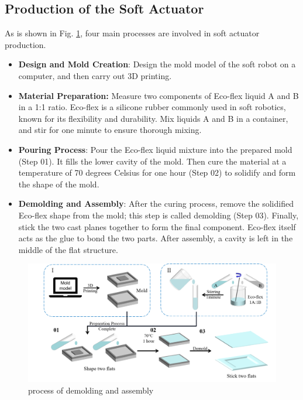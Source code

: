 \documentclass[10pt, a4paper, twocolumn]{article}
\begin{document}
\subsection{Production of the Soft Actuator}
As is shown in Fig. \ref{fig:demolding_assembly}, four main processes are involved in soft actuator production.
\begin{itemize}
    \item \textbf{Design and Mold Creation}: Design the mold model of the soft robot on a computer, and then carry out 3D printing.
    \item \textbf{Material Preparation:} Measure two components of Eco-flex liquid A and B in a 1:1 ratio. Eco-flex is a silicone rubber commonly used in soft robotics, known for its flexibility and durability. Mix liquids A and B in a container, and stir for one minute to ensure thorough mixing.
    \item \textbf{Pouring Process}: Pour the Eco-flex liquid mixture into the prepared mold (Step 01). It fills the lower cavity of the mold. Then cure the material at a temperature of 70 degrees Celsius for one hour (Step 02) to solidify and form the shape of the mold.
    \item \textbf{Demolding and Assembly}: After the curing process, remove the solidified Eco-flex shape from the mold; this step is called demolding (Step 03). Finally, stick the two cast planes together to form the final component. Eco-flex itself acts as the glue to bond the two parts. After assembly, a cavity is left in the middle of the flat structure.
\end{itemize}

\begin{figure}
    \centering
    \includegraphics[width=\linewidth]{demolding and assembly.png}
    \caption{process of demolding and assembly}
    \label{fig:demolding_assembly}
\end{figure}
\end{document}
